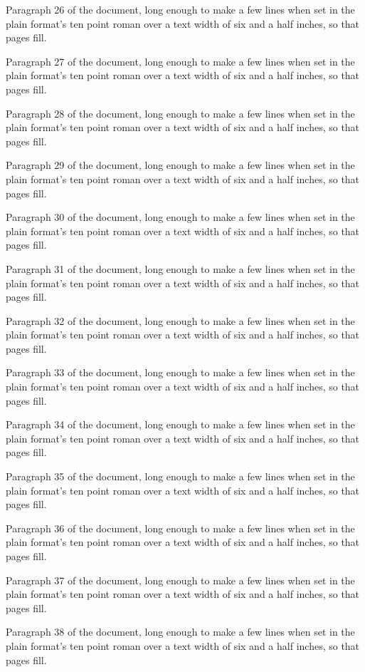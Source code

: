 Paragraph 26 of the document, long enough to make a few lines when set in the plain format's ten point roman over a text width of six and a half inches, so that pages fill.

Paragraph 27 of the document, long enough to make a few lines when set in the plain format's ten point roman over a text width of six and a half inches, so that pages fill.

Paragraph 28 of the document, long enough to make a few lines when set in the plain format's ten point roman over a text width of six and a half inches, so that pages fill.

Paragraph 29 of the document, long enough to make a few lines when set in the plain format's ten point roman over a text width of six and a half inches, so that pages fill.

Paragraph 30 of the document, long enough to make a few lines when set in the plain format's ten point roman over a text width of six and a half inches, so that pages fill.

Paragraph 31 of the document, long enough to make a few lines when set in the plain format's ten point roman over a text width of six and a half inches, so that pages fill.

Paragraph 32 of the document, long enough to make a few lines when set in the plain format's ten point roman over a text width of six and a half inches, so that pages fill.

Paragraph 33 of the document, long enough to make a few lines when set in the plain format's ten point roman over a text width of six and a half inches, so that pages fill.

Paragraph 34 of the document, long enough to make a few lines when set in the plain format's ten point roman over a text width of six and a half inches, so that pages fill.

Paragraph 35 of the document, long enough to make a few lines when set in the plain format's ten point roman over a text width of six and a half inches, so that pages fill.

Paragraph 36 of the document, long enough to make a few lines when set in the plain format's ten point roman over a text width of six and a half inches, so that pages fill.

Paragraph 37 of the document, long enough to make a few lines when set in the plain format's ten point roman over a text width of six and a half inches, so that pages fill.

Paragraph 38 of the document, long enough to make a few lines when set in the plain format's ten point roman over a text width of six and a half inches, so that pages fill.

